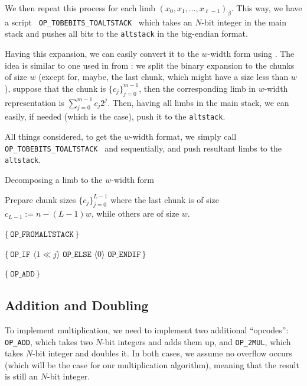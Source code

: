 \documentclass{iacrtrans}
\newcommand{\elem}[1]{\, \langle #1 \rangle \,}
\newcommand{\opcode}[1]{\, \texttt{#1} \,}
\newcommand{\script}[1]{ $\big\{ #1 \big\}$ }
\begin{document}
We then repeat this process for each limb $(x_0,x_1,\dots,x_{\ell-1})_{\beta}$. This way, we have a script \opcode{OP\_TOBEBITS\_TOALTSTACK} which takes an $N$-bit integer in the main stack and pushes all bits to the \texttt{altstack} in the big-endian format.

Having this expansion, we can easily convert it to the $w$-width form using . The idea is similar to one used in  from : we split the binary expansion to the chunks of size $w$ (except for, maybe, the last chunk, which might have a size less than $w$), suppose that the chunk is $\{c_j\}_{j=0}^{m-1}$, then the corresponding limb in $w$-width representation is $\sum_{j=0}^{m-1}c_j2^j$. Then, having all limbs in the main stack, we can easily, if needed (which is the case), push it to the \texttt{altstack}. 

All things considered, to get the $w$-width format, we simply call \opcode{OP\_TOBEBITS\_TOALTSTACK} and  sequentially, and push resultant limbs to the \texttt{altstack}.

\begin{algorithm}
\caption{Decomposing a limb to the $w$-width form}\label{alg:script_to_windowed_form}

Prepare chunk sizes $\{c_j\}_{j=0}^{L-1}$ where the last chunk is of size $c_{L-1} := n - (L-1)w$, while others are of size $w$.

 {
     {
        \script{\opcode{OP\_FROMALTSTACK}}

        \script{\opcode{OP\_IF} \elem{1 \ll j} \opcode{OP\_ELSE} \elem{0} \opcode{OP\_ENDIF}}
    }

     {
        \script{\opcode{OP\_ADD}}
    }
}
\end{algorithm}

\subsection{Addition and Doubling}

To implement multiplication, we need to implement two additional ``opcodes'': \texttt{OP\_ADD}, which takes two $N$-bit integers and adds them up, and \texttt{OP\_2MUL}, which takes $N$-bit integer and doubles it. In both cases, we assume no overflow occurs (which will be the case for our multiplication algorithm), meaning that the result is still an $N$-bit integer. 
\end{document}
